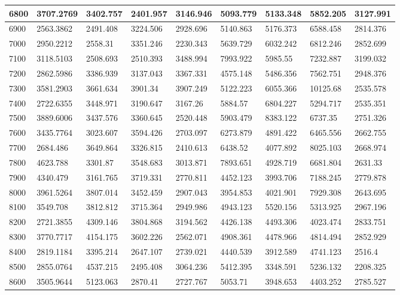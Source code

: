 \documentclass [11pt, proquest] {uwthesis}[2020/12/20]
\begin{document}
\begin{table}[]
\begin{tiny}
\begin{tabular}{|l|l|l|l|l|l|l|l|l|}
6800 & 3707.2769 & 3402.757 & 2401.957 & 3146.946 & 5093.779 & 5133.348 & 5852.205 & 3127.991 \\ \hline
6900 & 2563.3862 & 2491.408 & 3224.506 & 2928.696 & 5140.863 & 5176.373 & 6588.458 & 2814.376 \\ \hline
7000 & 2950.2212 & 2558.31 & 3351.246 & 2230.343 & 5639.729 & 6032.242 & 6812.246 & 2852.699 \\ \hline
7100 & 3118.5103 & 2508.693 & 2510.393 & 3488.994 & 7993.922 & 5985.55 & 7232.887 & 3199.032 \\ \hline
7200 & 2862.5986 & 3386.939 & 3137.043 & 3367.331 & 4575.148 & 5486.356 & 7562.751 & 2948.376 \\ \hline
7300 & 3581.2903 & 3661.634 & 3901.34 & 3907.249 & 5122.223 & 6055.366 & 10125.68 & 2535.578 \\ \hline
7400 & 2722.6355 & 3448.971 & 3190.647 & 3167.26 & 5884.57 & 6804.227 & 5294.717 & 2535.351 \\ \hline
7500 & 3889.6006 & 3437.576 & 3360.645 & 2520.448 & 5903.479 & 8383.122 & 6737.35 & 2751.326 \\ \hline
7600 & 3435.7764 & 3023.607 & 3594.426 & 2703.097 & 6273.879 & 4891.422 & 6465.556 & 2662.755 \\ \hline
7700 & 2684.486 & 3649.864 & 3326.815 & 2410.613 & 6438.52 & 4077.892 & 8025.103 & 2668.974 \\ \hline
7800 & 4623.788 & 3301.87 & 3548.683 & 3013.871 & 7893.651 & 4928.719 & 6681.804 & 2631.33 \\ \hline
7900 & 4340.479 & 3161.765 & 3719.331 & 2770.811 & 4452.123 & 3993.706 & 7188.245 & 2779.878 \\ \hline
8000 & 3961.5264 & 3807.014 & 3452.459 & 2907.043 & 3954.853 & 4021.901 & 7929.308 & 2643.695 \\ \hline
8100 & 3549.708 & 3812.812 & 3715.364 & 2949.986 & 4943.123 & 5520.156 & 5313.925 & 2967.196 \\ \hline
8200 & 2721.3855 & 4309.146 & 3804.868 & 3194.562 & 4426.138 & 4493.306 & 4023.474 & 2833.751 \\ \hline
8300 & 3770.7717 & 4154.175 & 3602.226 & 2562.071 & 4908.361 & 4478.966 & 4814.494 & 2852.929 \\ \hline
8400 & 2819.1184 & 3395.214 & 2647.107 & 2739.021 & 4440.539 & 3912.589 & 4741.123 & 2516.4 \\ \hline
8500 & 2855.0764 & 4537.215 & 2495.408 & 3064.236 & 5412.395 & 3348.591 & 5236.132 & 2208.325 \\ \hline
8600 & 3505.9644 & 5123.063 & 2870.41 & 2727.767 & 5053.71 & 3948.653 & 4403.252 & 2785.527 \\ \hline

\end{tabular}
\end{tiny}
\end{table}
\end{document}
